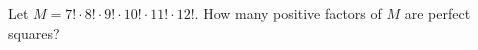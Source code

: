 Let $M=7!\cdot8!\cdot9!\cdot10!\cdot11!\cdot12!$. How many positive factors of $M$ are perfect squares?
